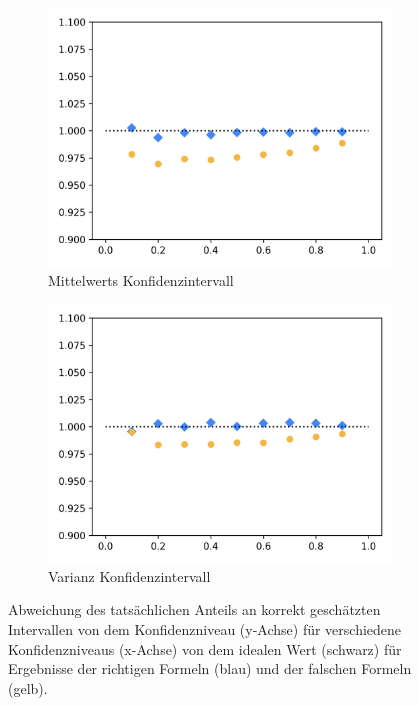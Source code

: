 \documentclass[10pt,twocolumn]{scrartcl}
\begin{document}
		\begin{figure}[H]%
			\centering
			\begin{subfigure}[c]{1\columnwidth}
				\includegraphics[width=0.9\columnwidth]{images/mean_interval.png}
				\caption{Mittelwerts Konfidenzintervall}
				\label{fig_mean_interval_dot}
			\end{subfigure}
			\begin{subfigure}[c]{1\columnwidth}
				\includegraphics[width=0.9\columnwidth]{images/var_interval.png}
				\caption{Varianz Konfidenzintervall}
				\label{fig_var_interval_dot}
			\end{subfigure}
			\caption{Abweichung des tatsächlichen Anteils an korrekt geschätzten Intervallen von dem Konfidenzniveau (y-Achse) für verschiedene Konfidenzniveaus (x-Achse) von dem idealen Wert (schwarz) für Ergebnisse der richtigen Formeln (blau) und der falschen Formeln (gelb).}
		\end{figure}
\end{document}
